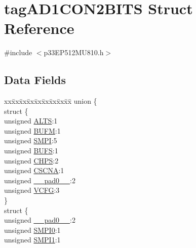 \hypertarget{structtag_a_d1_c_o_n2_b_i_t_s}{}\section{tag\+A\+D1\+C\+O\+N2\+B\+I\+TS Struct Reference}
\label{structtag_a_d1_c_o_n2_b_i_t_s}


{\ttfamily \#include $<$p33\+E\+P512\+M\+U810.\+h$>$}

\subsection*{Data Fields}
\begin{DoxyCompactItemize}
\item 
\begin{tabbing}
xx\=xx\=xx\=xx\=xx\=xx\=xx\=xx\=xx\=\kill
union \{\\
\>struct \{\\
\>\>unsigned \hyperlink{structtag_a_d1_c_o_n2_b_i_t_s_a2ca4bba4fd8aa0ee225e33a1176e77d5}{ALTS}:1\\
\>\>unsigned \hyperlink{structtag_a_d1_c_o_n2_b_i_t_s_ae8ba75a83c3c2b9805c68736be55fa08}{BUFM}:1\\
\>\>unsigned \hyperlink{structtag_a_d1_c_o_n2_b_i_t_s_ad1b5f5e88678d207e1a1643b2a32d45e}{SMPI}:5\\
\>\>unsigned \hyperlink{structtag_a_d1_c_o_n2_b_i_t_s_a30b636279b2b14ed975067c5bb135ec1}{BUFS}:1\\
\>\>unsigned \hyperlink{structtag_a_d1_c_o_n2_b_i_t_s_af592586989b5aefff55bc1b464da0586}{CHPS}:2\\
\>\>unsigned \hyperlink{structtag_a_d1_c_o_n2_b_i_t_s_ab5835d71115f1e3cf69c69d2dcb0dc51}{CSCNA}:1\\
\>\>unsigned \hyperlink{structtag_a_d1_c_o_n2_b_i_t_s_adf71f3d8410c1f1dbbc96680a92c49af}{\_\_pad0\_\_}:2\\
\>\>unsigned \hyperlink{structtag_a_d1_c_o_n2_b_i_t_s_a5abe40529762f93d063581f9c25cae44}{VCFG}:3\\
\>\} \\
\>struct \{\\
\>\>unsigned \hyperlink{structtag_a_d1_c_o_n2_b_i_t_s_adf71f3d8410c1f1dbbc96680a92c49af}{\_\_pad0\_\_}:2\\
\>\>unsigned \hyperlink{structtag_a_d1_c_o_n2_b_i_t_s_a1f4e3902bbb6a31f3e0c074b6db0b021}{SMPI0}:1\\
\>\>unsigned \hyperlink{structtag_a_d1_c_o_n2_b_i_t_s_ad9c086bd1573d17af86b7dd8a21510f6}{SMPI1}:1\\

\end{tabbing}
\end{DoxyCompactItemize}
